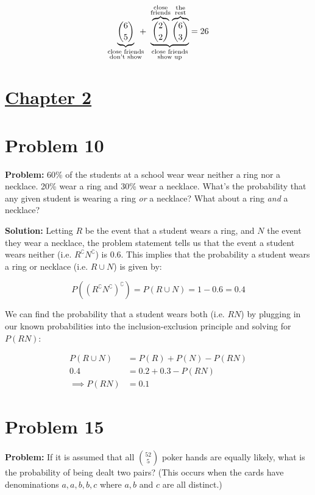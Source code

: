 \documentclass{article}
\begin{document}
\begin{equation*}
    \underbrace{\binom{6}{5}}_{\substack{\text{close friends}\\ \text{don't show}}}\mkern-12mu+\,\,\underbrace{\overbrace{\binom{2}{2}}^{\substack{\text{close}\\ \text{friends}}}\overbrace{\binom{6}{3}}^{\substack{\text{the}\\ \text{rest}}}}_{\substack{\text{close friends}\\ \text{show up}}}=26
\end{equation*}

\section*{\underline{Chapter 2}}
\section*{Problem 10}
\noindent\textbf{Problem:} 60\% of the students at a school wear wear neither a ring nor a necklace. 20\% wear a ring and 30\% wear a necklace. What's the probability that any given student is wearing a ring \textit{or} a necklace? What about a ring \textit{and} a necklace?
\bigskip

\noindent\textbf{Solution:} Letting $R$ be the event that a student wears a ring, and $N$ the event they wear a necklace, the problem statement tells us that the event a student wears neither (i.e. $R^\complement N^\complement$) is $0.6$. This implies that the probability a student wears a ring or necklace (i.e. $R\cup N$) is given by:

\begin{equation*}
    P((R^\complement N^\complement)^\complement)=P(R\cup N)=1-0.6=0.4
\end{equation*}

We can find the probability that a student wears both (i.e. $RN$) by plugging in our known probabilities into the inclusion-exclusion principle and solving for $P(RN)$:

\begin{align*}
    P(R\cup N)&=P(R)+P(N)-P(RN)\\
    0.4&=0.2+0.3-P(RN)\\
    \implies P(RN)&=0.1
\end{align*}

\section*{Problem 15}
\noindent\textbf{Problem:} If it is assumed that all $\binom{52}{5}$ poker hands are equally likely, what is the probability of being dealt two pairs? (This occurs when the cards have denominations $a,a,b,b,c$ where $a,b$ and $c$ are all distinct.)
\bigskip
\end{document}
